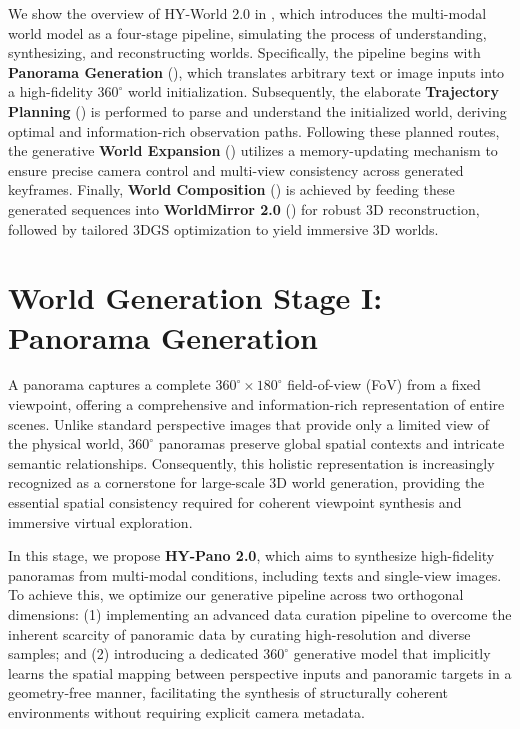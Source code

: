 \documentclass{article} %
\begin{document}
We show the overview of HY-World 2.0 in , which introduces the multi-modal world model as a four-stage pipeline, simulating the process of understanding, synthesizing, and reconstructing worlds.
Specifically, the pipeline begins with \textbf{Panorama Generation} (), which translates arbitrary text or image inputs into a high-fidelity $360^{\circ}$ world initialization.
Subsequently, the elaborate \textbf{Trajectory Planning} () is performed to parse and understand the initialized world, deriving optimal and information-rich observation paths.
Following these planned routes, the generative \textbf{World Expansion} () utilizes a memory-updating mechanism to ensure precise camera control and multi-view consistency across generated keyframes.
Finally, \textbf{World Composition} () is achieved by feeding these generated sequences into \textbf{WorldMirror 2.0} () for robust 3D reconstruction, followed by tailored 3DGS optimization to yield immersive 3D worlds.


\section{World Generation Stage I: Panorama Generation}
\label{sec:panorama_gen}
A panorama captures a complete $360^{\circ} \times 180^{\circ}$ field-of-view (FoV) from a fixed viewpoint, offering a comprehensive and information-rich representation of entire scenes. 
Unlike standard perspective images that provide only a limited view of the physical world, $360^{\circ}$ panoramas preserve global spatial contexts and intricate semantic relationships.
Consequently, this holistic representation is increasingly recognized as a cornerstone for large-scale 3D world generation, providing the essential spatial consistency required for coherent viewpoint synthesis and immersive virtual exploration.

In this stage, we propose \textbf{HY-Pano 2.0}, which aims to synthesize high-fidelity panoramas from multi-modal conditions, including texts and single-view images. 
To achieve this, we optimize our generative pipeline across two orthogonal dimensions: 
(1) implementing an advanced data curation pipeline to overcome the inherent scarcity of panoramic data by curating high-resolution and diverse samples; and 
(2) introducing a dedicated $360^{\circ}$ generative model that implicitly learns the spatial mapping between perspective inputs and panoramic targets in a geometry-free manner, facilitating the synthesis of structurally coherent environments without requiring explicit camera metadata.
\end{document}
